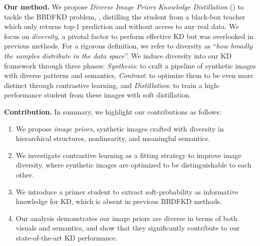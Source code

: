\begin{foldable} %
    \textbf{Our method.} We propose \textit{Diverse Image Priors Knowledge Distillation} (\textbf{\methodname}) to tackle the BBDFKD problem, \ie, distilling the student from a black-box teacher which only returns top-1 prediction and without access to any real data.
    We focus on \textit{diversity}, a pivotal factor to perform effective KD but was overlooked in previous methods.
    For a rigorous definition, we refer to diversity as ``\textit{how broadly the samples distribute in the data space}''.
    We induce diversity into our KD framework through three phases:
        \textit{Synthesis}: to craft a pipeline of synthetic images with diverse patterns and semantics,
        \textit{Contrast}: to optimize them to be even more distinct through contrastive learning,
        and \textit{Distillation}: to train a high-performance student from these images with soft distillation.
\end{foldable}

\begin{foldable} %
    \textbf{Contribution.} In summary, we highlight our contributions as follows:
    \begin{enumerate}
        \item We propose \textit{image priors}, synthetic images crafted with diversity in hierarchical structures, nonlinearity, and meaningful semantics.
        \item We investigate contrastive learning as a fitting strategy to improve image diversity, where synthetic images are optimized to be distinguishable to each other.
        \item We introduce a primer student to extract soft-probability as informative knowledge for KD, which is absent in previous BBDFKD methods.
        \item Our analysis demonstrates our image priors are diverse in terms of both visuals and semantics, and show that they significantly contribute to our state-of-the-art KD performance.
    \end{enumerate}
\end{foldable}
